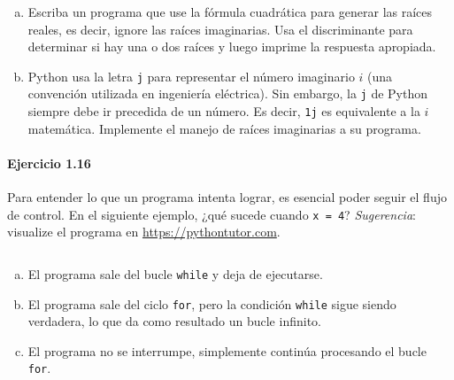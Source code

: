 \begin{enumerate}[(a)]
	\item

	      Escriba un programa que use la fórmula cuadrática para
	      generar las raíces reales, es decir, ignore las raíces
	      imaginarias.
	      Usa el discriminante para determinar si hay una o dos
	      raíces y luego imprime la respuesta apropiada.

	\item

	      Python usa la letra \texttt{j} para representar
	      el número imaginario $i$ (una convención utilizada en
	      ingeniería eléctrica).
	      Sin embargo, la \texttt{j} de Python siempre debe
	      ir precedida de un número.
	      Es decir, \texttt{1j} es equivalente a la $i$
	      matemática.
	      Implemente el manejo de raíces imaginarias a su programa.
\end{enumerate}

\paragraph{\color{DarkBlue}Ejercicio 1.16}
Para entender lo que un programa intenta lograr, es esencial poder
seguir el flujo de control.
En el siguiente ejemplo, ¿qué sucede cuando \texttt{x = 4}?
\emph{Sugerencia}: visualize el programa en
\url{https://pythontutor.com}.

\begin{listing}[ht!]
	\inputminted{python}{1.16.py}
\end{listing}

\begin{enumerate}[(a)]
	\item

	      El programa sale del bucle \texttt{while} y deja
	      de ejecutarse.

	\item

	      El programa sale del ciclo \texttt{for}, pero la
	      condición \texttt{while} sigue siendo verdadera,
	      lo que da como resultado un bucle infinito.

	\item

	      El programa no se interrumpe, simplemente continúa procesando
	      el bucle \texttt{for}.
\end{enumerate}

